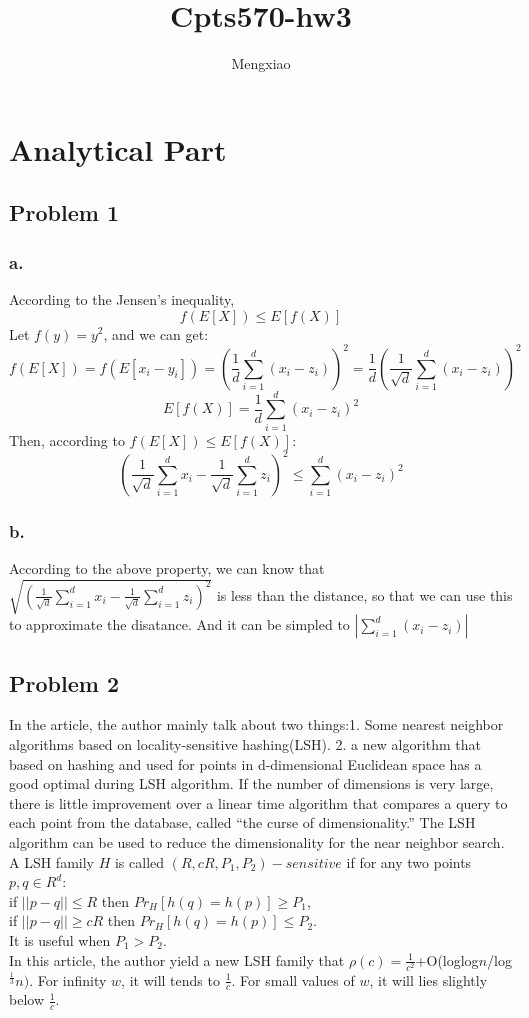 \documentclass[12pt]{article}
\author{Mengxiao}
\title{Cpts570-hw3}
\begin{document}
	\maketitle
	\pagebreak
	\section{Analytical Part}
		\subsection{Problem 1}
			\subsubsection{a.}
				According to the Jensen's inequality,
				$$f(E[X])\leq E[f(X)]$$
				Let $f(y)=y^2$, and we can get:
				$$f(E[X])=f(E[x_i-y_i])=(\frac{1}{d}\sum_{i=1}^d(x_i-z_i))^2=\frac{1}{d}(\frac{1}{\sqrt{d}}\sum_{i=1}^d(x_i-z_i))^2$$
				$$E[f(X)]=\frac{1}{d}\sum_{i=1}^d(x_i-z_i)^2$$
				Then, according to $f(E[X])\leq E[f(X)]$:
				$$(\frac{1}{\sqrt{d}}\sum_{i=1}^dx_i-\frac{1}{\sqrt{d}}\sum_{i=1}^dz_i)^2\leq\sum_{i=1}^d(x_i-z_i)^2$$
			\subsubsection{b.}
				According to the above property, we can know that $\sqrt{(\frac{1}{\sqrt{d}}\sum_{i=1}^dx_i-\frac{1}{\sqrt{d}}\sum_{i=1}^dz_i)^2}$ is less than the distance, so that we can use this to approximate the disatance. And it can be simpled to $|\sum_{i=1}^d(x_i-z_i)|$
		\subsection{Problem 2}
			In the article, the author mainly talk about two things:1. Some nearest neighbor algorithms based on locality-sensitive hashing(LSH). 2. a new algorithm that based on hashing and used for points in d-dimensional Euclidean space has a good optimal during LSH algorithm. If the number of dimensions is very large, there is little improvement over a linear time algorithm that compares a query to each point from the database, called “the curse of dimensionality.” The LSH algorithm can be used to reduce the dimensionality for the near neighbor search. A LSH family $H$ is called $(R,cR,P_1,P_2)-sensitive$ if for any two points$p,q\in R^d$:
\\if $||p-q||\leq R$ then $Pr_H[h(q)=h(p)]\geq P_1$,
\\if $||p-q||\geq cR$ then $Pr_H[h(q)=h(p)]\leq P_2$.
\\It is useful when $P_1>P_2$.\\
			In this article, the author yield a new LSH family that $\rho(c)=\frac{1}{c^2}$+O(loglog$n$/log$^\frac{1}{3}n)$. For infinity $w$, it will tends to $\frac{1}{c}$. For small values of $w$, it will lies slightly below $\frac{1}{c}$.
\end{document}
